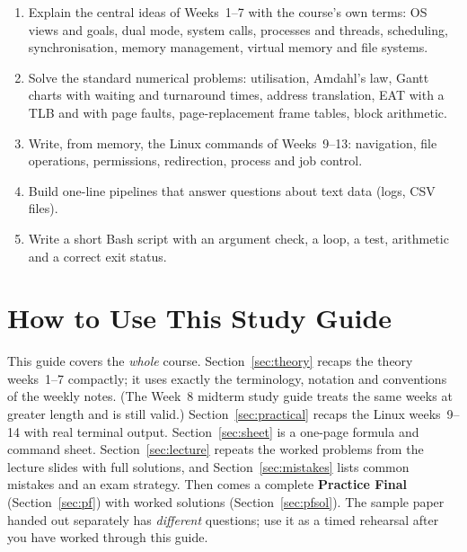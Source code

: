 \documentclass[11pt,a4paper]{article}
\begin{document}
\vspace{0.8em}
\begin{keyidea}
\begin{enumerate}[leftmargin=1.4em]
  \item Explain the central ideas of Weeks~1--7 with the course's own terms: OS views and goals, dual mode, system calls, processes and threads, scheduling, synchronisation, memory management, virtual memory and file systems.
  \item Solve the standard numerical problems: utilisation, Amdahl's law, Gantt charts with waiting and turnaround times, address translation, EAT with a TLB and with page faults, page-replacement frame tables, block arithmetic.
  \item Write, from memory, the Linux commands of Weeks~9--13: navigation, file operations, permissions, redirection, process and job control.
  \item Build one-line pipelines that answer questions about text data (logs, CSV files).
  \item Write a short Bash script with an argument check, a loop, a test, arithmetic and a correct exit status.
\end{enumerate}
\end{keyidea}

\setcounter{tocdepth}{1}
\tableofcontents

\section{How to Use This Study Guide}

This guide covers the \emph{whole} course. Section~\ref{sec:theory} recaps the theory weeks~1--7 compactly; it uses exactly the terminology, notation and conventions of the weekly notes. (The Week~8 midterm study guide treats the same weeks at greater length and is still valid.) Section~\ref{sec:practical} recaps the Linux weeks~9--14 with real terminal output. Section~\ref{sec:sheet} is a one-page formula and command sheet. Section~\ref{sec:lecture} repeats the worked problems from the lecture slides with full solutions, and Section~\ref{sec:mistakes} lists common mistakes and an exam strategy. Then comes a complete \textbf{Practice Final} (Section~\ref{sec:pf}) with worked solutions (Section~\ref{sec:pfsol}). The sample paper handed out separately has \emph{different} questions; use it as a timed rehearsal after you have worked through this guide.
\end{document}
